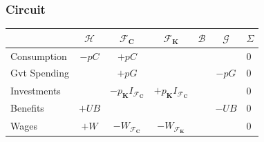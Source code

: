 \documentclass[]{beamer}
\begin{document}
\begin{frame}
\frametitle{Circuit}
	\begin{table}
		\centering
		\begin{tabular}{l|ccccc|l}
			
			& $\mathcal{H}$                   & $\mathcal{F}_\mathbf{C}$                                                                                    & $\mathcal{F}_\mathbf{K}$                                                                                    & $\mathcal{B}$                                             & $\mathcal{G}$       & $\Sigma$ \\
			\midrule
			Consumption            & $-p C$                          & $+p C$                                                                                                      &                                                                                                             &                                                           &                     & 0        \\
			Gvt Spending           &                                 & $+p G$                                                                                                      &                                                                                                             &                                                           & $-p G$              & 0        \\
			Investments            &                                 & $-p_\mathbf{K} I_{\mathcal{F}_\mathbf{C}}$                                                                  & $+p_\mathbf{K} I_{\mathcal{F}_\mathbf{C}}$                                                                  &                                                           &                     & 0        \\
			Benefits               & $+UB$                           &                                                                                                             &                                                                                                             &                                                           & $-UB$               & 0        \\
			Wages                  & $+W$                            & $-W_{\mathcal{F}_\mathbf{C}}$                                                                               & $-W_{\mathcal{F}_\mathbf{K}}$                                                                               &                                                           &                     & 0        \\

\end{tabular}
\end{table}
\end{frame}
\end{document}
